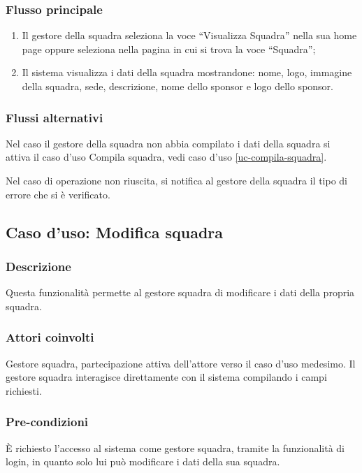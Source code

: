 \subsubsection*{Flusso principale}

\begin{enumerate}
	
	\item
	Il gestore della squadra seleziona la voce ``Visualizza Squadra'' nella sua home page oppure seleziona nella pagina in cui si trova la voce ``Squadra'';
	
	\item
	Il sistema visualizza i dati della squadra mostrandone: nome, logo, immagine della squadra, sede, descrizione, nome dello sponsor e logo dello sponsor.
	
\end{enumerate}

\subsubsection*{Flussi alternativi}
Nel caso il gestore della squadra non abbia compilato i dati della squadra si attiva il caso d'uso Compila squadra, vedi caso d'uso \vref{uc-compila-squadra}.

Nel caso di operazione non riuscita, si notifica al gestore della squadra il tipo di errore che si è verificato.


%
%
\subsection{Caso d'uso: Modifica squadra}
\label{uc-modifica-squadra}

\subsubsection*{Descrizione}
Questa funzionalità permette al gestore squadra di modificare i dati della propria squadra.

\subsubsection*{Attori coinvolti}
Gestore squadra, partecipazione attiva dell'attore verso il caso d'uso medesimo.
Il gestore squadra interagisce direttamente con il sistema compilando i campi richiesti.

\subsubsection*{Pre-condizioni}
È richiesto l'accesso al sistema come gestore squadra, tramite la funzionalità di login, in quanto solo lui può modificare i dati della sua squadra.

